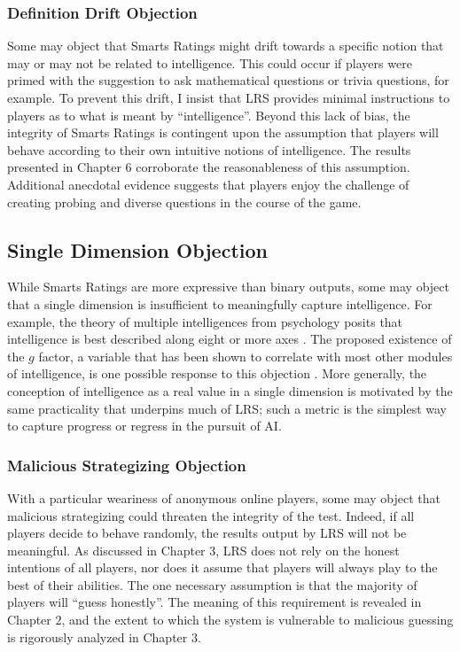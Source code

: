 \subsubsection{Definition Drift Objection}

Some may object that Smarts Ratings might drift towards a specific notion that may or may not be related to intelligence. This could occur if players were primed with the suggestion to ask mathematical questions or trivia questions, for example. To prevent this drift, I insist that LRS provides minimal instructions to players as to what is meant by ``intelligence''. Beyond this lack of bias, the integrity of Smarts Ratings is contingent upon the assumption that players will behave according to their own intuitive notions of intelligence. The results presented in Chapter $6$ corroborate the reasonableness of this assumption. Additional anecdotal evidence suggests that players enjoy the challenge of creating probing and diverse questions in the course of the game.

\subsection{Single Dimension Objection}

While Smarts Ratings are more expressive than binary outputs, some may object that a single dimension is insufficient to meaningfully capture intelligence. For example, the theory of multiple intelligences from psychology posits that intelligence is best described along eight or more axes \citep{gardner2011frames}. The proposed existence of the $g$ factor, a variable that has been shown to correlate with most other modules of intelligence, is one possible response to this objection  \citep{visser2006g}. More generally, the conception of intelligence as a real value in a single dimension is motivated by the same practicality that underpins much of LRS; such a metric is the simplest way to capture progress or regress in the pursuit of AI.

\subsubsection{Malicious Strategizing Objection}

With a particular weariness of anonymous online players, some may object that malicious strategizing could threaten the integrity of the test. Indeed, if all players decide to behave randomly, the results output by LRS will not be meaningful. As discussed in Chapter $3$, LRS does not rely on the honest intentions of all players, nor does it assume that players will always play to the best of their abilities. The one necessary assumption is that the majority of players will ``guess honestly''. The meaning of this requirement is revealed in Chapter $2$, and the extent to which the system is vulnerable to malicious guessing is rigorously analyzed in Chapter $3$.

